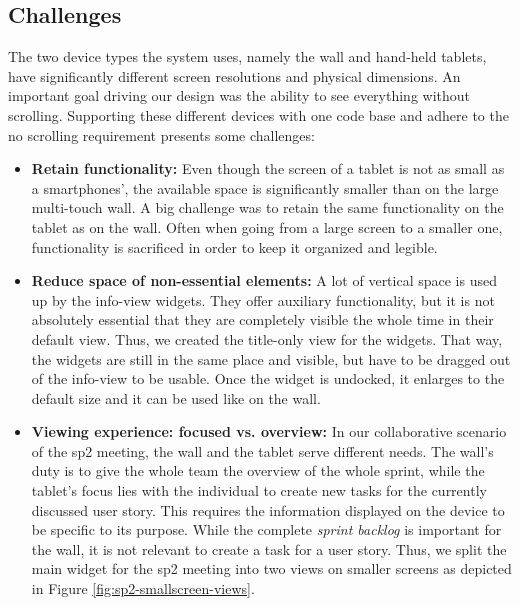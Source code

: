 \documentclass{sigchi}
\begin{document}
\subsection{Challenges}
The two device types the system uses, namely the wall and hand-held tablets, have significantly different screen resolutions and physical dimensions. 
An important goal driving our design was the ability to see everything without scrolling.
Supporting these different devices with one code base and adhere to the no scrolling requirement presents some challenges:

\begin{itemize}
	\item \textbf{Retain functionality:} 
	Even though the screen of a tablet is not as small as a smartphones', the available space is significantly smaller than on the large multi-touch wall. 
	A big challenge was to retain the same functionality on the tablet as on the wall. Often when going from a large screen to a smaller one, functionality is sacrificed in order to  keep it organized and legible.
	
	\item \textbf{Reduce space of non-essential elements:}
	A lot of vertical space is used up by the info-view widgets.
	They offer auxiliary functionality, but it is not absolutely essential that they are completely visible the whole time in their default view.
	Thus, we created the title-only view for the widgets.
	That way, the widgets are still in the same place and visible, but have to be dragged out of the info-view to be usable.
	Once the widget is undocked, it enlarges to the default size and it can be used like on the wall.
	
	\item \textbf{Viewing experience: focused vs. overview:}
	In our collaborative scenario of the \gls{sp2} meeting, the wall and the tablet serve different needs.
	The wall's duty is to give the whole team the overview of the whole sprint, while the tablet's focus lies with the individual to create new tasks for the currently discussed user story.
	This requires the information displayed on the device to be specific to its purpose.
	While the complete \textit{sprint backlog} is important for the wall, it is not relevant to create a task for a user story.
	Thus, we split the main widget for the \gls{sp2} meeting into two views on smaller screens as depicted in Figure \ref{fig:sp2-smallscreen-views}.
	
\end{itemize}
\end{document}
